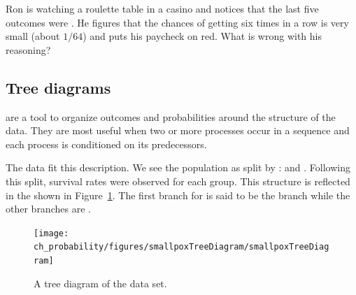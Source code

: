 \begin{exercisewrap}
\begin{nexercise}
Ron is watching a roulette table in a casino and notices that the last five outcomes were . He figures that the chances of getting  six times in a row is very small (about $1/64$) and puts his paycheck on red. What is wrong with his reasoning?\footnotemark
\end{nexercise}
\end{exercisewrap}


\D{\newpage}

\subsection{Tree diagrams}


 are a tool to organize outcomes and probabilities around the structure of the data. They are most useful when two or more processes occur in a sequence and each process is conditioned on its predecessors.

The  data fit this description. We see the population as split by :  and . Following this split, survival rates were observed for each group. This structure is reflected in the  shown in Figure~\ref{smallpoxTreeDiagram}. The first branch for  is said to be the  branch while the other branches are .

\begin{figure}[ht]
\centering
\texttt{[image: ch\_probability/figures/smallpoxTreeDiagram/smallpoxTreeDiagram]}
\caption{A tree diagram of the  data set.}
\label{smallpoxTreeDiagram}
\end{figure}

